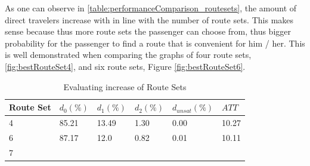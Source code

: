As one can observe in \vref{table:performanceComparison_routesets}, the amount of direct travelers increase with in line with the number of route sets. This makes sense because thus more route sets the passenger can choose from, thus bigger probability for the passenger to find a route that is convenient for him / her. This is well demonstrated when comparing the graphs of four route sets, \vref{fig:bestRouteSet4}, and six route sets, Figure \vref{fig:bestRouteSet6}.  

 \begin{table}[H]
    \centering
    \begin{tabular}{|l||l|l|l|l|l|}
    \hline
    Route Set & $d_0(\%)$ & $d_1(\%)$ & $d_2(\%)$ & $d_{unsat}(\%)$ & $ATT$ \\
    \hline
    4 & 85.21 & 13.49 & 1.30 & 0.00 & 10.27\\
    \hline
    6 & 87.17 & 12.0 & 0.82 & 0.01 & 10.11\\
    \hline
    7 \\
    \hline
    \end{tabular}
    \caption {Evaluating increase of Route Sets}
    \label{table:performanceComparison_routesets}
\end{table}